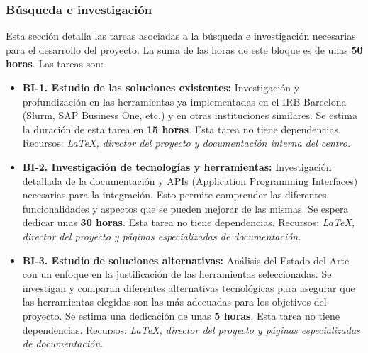 \subsubsection{Búsqueda e investigación}\label{ssec:Descripción de las tareas}
Esta sección detalla las tareas asociadas a la búsqueda e investigación necesarias para el desarrollo del proyecto.
La suma de las horas de este bloque es de unas \textbf{50 horas}. Las tareas son: 
\begin{itemize}
    \item \textbf{BI-1. Estudio de las soluciones existentes:} Investigación y profundización en las herramientas ya implementadas en el 
    IRB Barcelona (Slurm, SAP Business One, etc.) y en otras instituciones similares. Se estima la duración de esta tarea en \textbf{15 horas}.
    \newline Esta tarea no tiene dependencias.
    \newline Recursos: \textit {LaTeX, director del proyecto y documentación interna del centro.}
    
    \item \textbf{BI-2. Investigación de tecnologías y herramientas:} Investigación detallada de la documentación y APIs (Application 
    Programming Interfaces) necesarias para la integración. Esto permite comprender las diferentes funcionalidades y 
    aspectos que se pueden mejorar de las mismas. Se espera dedicar unas \textbf{30 horas}.
    \newline Esta tarea no tiene dependencias.
    \newline Recursos: \textit {LaTeX, director del proyecto y páginas especializadas de documentación.}
    
    \item \textbf{BI-3. Estudio de soluciones alternativas:} Análisis del Estado del Arte con un enfoque en la justificación de las herramientas seleccionadas.
    Se investigan y comparan diferentes alternativas tecnológicas para asegurar que las herramientas elegidas son las más adecuadas para los objetivos del proyecto. Se estima una dedicación de unas \textbf{5 horas}.
    \newline Esta tarea no tiene dependencias.
    \newline Recursos: \textit {LaTeX, director del proyecto y páginas especializadas de documentación.}
\end{itemize}